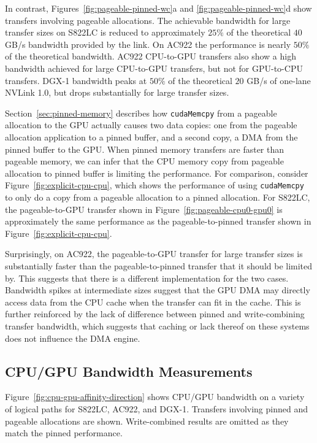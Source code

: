 In contrast, Figures~\ref{fig:pageable-pinned-wc}a and \ref{fig:pageable-pinned-wc}d show transfers involving pageable allocations.
The achievable bandwidth for large transfer sizes on S822LC is reduced to approximately $25\%$ of the theoretical $40$ GB/s bandwidth provided by the link.
On AC922 the performance is nearly $50\%$ of the theoretical bandwidth.
AC922 CPU-to-GPU transfers also show a high bandwidth achieved for large CPU-to-GPU transfers, but not for GPU-to-CPU transfers.
DGX-1 bandwidth peaks at $50\%$ of the theoretical $20$ GB/s of one-lane NVLink 1.0, but drops substantially for large transfer sizes.

Section~\ref{sec:pinned-memory} describes how \texttt{cudaMemcpy} from a pageable allocation to the GPU actually causes two data copies: one from the pageable allocation application to a pinned buffer, and a second copy, a DMA from the pinned buffer to the GPU.
When pinned memory transfers are faster than pageable memory, we can infer that the CPU memory copy from pageable allocation to pinned buffer is limiting the performance.
For comparison, consider Figure~\ref{fig:explicit-cpu-cpu}, which shows the performance of using \texttt{cudaMemcpy} to only do a copy from a pageable allocation to a pinned allocation.
For S822LC, the pageable-to-GPU transfer shown in Figure~\ref{fig:pageable-cpu0-gpu0} is approximately the same performance as the pageable-to-pinned transfer shown in Figure~\ref{fig:explicit-cpu-cpu}.

Surprisingly, on AC922, the pageable-to-GPU transfer for large transfer sizes is substantially faster than the pageable-to-pinned transfer that it should be limited by.
This suggests that there is a different implementation for the two cases.
Bandwidth spikes at intermediate sizes suggest that the GPU DMA may directly access data from the CPU cache when the transfer can fit in the cache.
This is further reinforced by the lack of difference between pinned and write-combining transfer bandwidth, which suggests that caching or lack thereof on these systems does not influence the DMA engine.

\subsection{CPU/GPU Bandwidth Measurements}

Figure~\ref{fig:cpu-gpu-affinity-direction} shows CPU/GPU bandwidth on a variety of logical paths for S822LC, AC922, and DGX-1.
Transfers involving pinned and pageable allocations are shown.
Write-combined results are omitted as they match the pinned performance.

